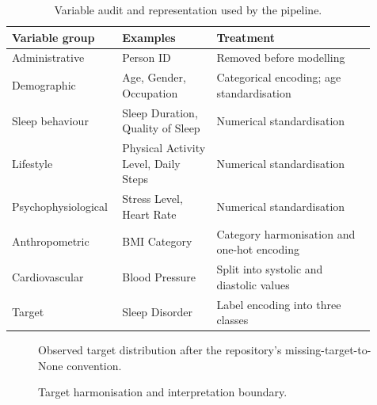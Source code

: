 ﻿\documentclass[preprint,12pt]{elsarticle}
\begin{document}
\begin{table}[t]
\centering
\caption{Variable audit and representation used by the pipeline.}
\label{tab:variables}
\small
\begin{tabular}{p{0.24\linewidth}p{0.25\linewidth}p{0.42\linewidth}}
\toprule
Variable group & Examples & Treatment \\
\midrule
Administrative & Person ID & Removed before modelling \\
Demographic & Age, Gender, Occupation & Categorical encoding; age standardisation \\
Sleep behaviour & Sleep Duration, Quality of Sleep & Numerical standardisation \\
Lifestyle & Physical Activity Level, Daily Steps & Numerical standardisation \\
Psychophysiological & Stress Level, Heart Rate & Numerical standardisation \\
Anthropometric & BMI Category & Category harmonisation and one-hot encoding \\
Cardiovascular & Blood Pressure & Split into systolic and diastolic values \\
Target & Sleep Disorder & Label encoding into three classes \\
\bottomrule
\end{tabular}
\end{table}

\begin{figure}[t]
\centering
{}
\caption{Observed target distribution after the repository's missing-target-to-None convention.}
\label{fig:distribution}
\end{figure}

\begin{figure}[t]
\centering
{}
\caption{Target harmonisation and interpretation boundary.}
\label{fig:target}
\end{figure}
\end{document}

